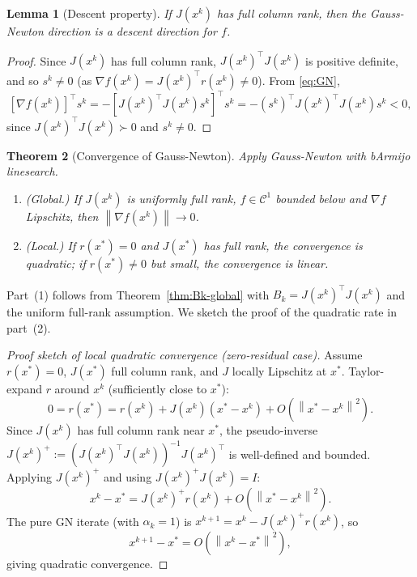 \documentclass[11pt,a4paper]{report}
\theoremstyle{plain}
\newtheorem{theorem}{Theorem}[chapter]
\newtheorem{lemma}[theorem]{Lemma}
\theoremstyle{definition}
\newcommand{\norm}[1]{\left\lVert#1\right\rVert}
\newcommand{\grad}{\nabla}
\newcommand{\trans}{^{\top}}
\begin{document}
\begin{lemma}[Descent property]\label{lem:GN-descent}
If $J(x^{k})$ has full column rank, then the Gauss-Newton direction is a descent
direction for $f$.
\end{lemma}
\begin{proof}
  Since $J(x^k)$ has full column rank, $J(x^k)\trans J(x^k)$ is positive definite, and so $s^{k}\ne 0$ (as $\grad f(x^{k})=J(x^{k})\trans r(x^{k})\ne 0$). From \eqref{eq:GN},
  \[
    [\grad f(x^k)]\trans s^k
    =-[J(x^{k})\trans J(x^{k})s^{k}]\trans s^{k}
    =-(s^{k})\trans J(x^{k})\trans J(x^{k})s^{k}<0,
  \]
  since $J(x^{k})\trans J(x^{k})\succ 0$ and $s^{k}\ne 0$.
\end{proof}

\begin{theorem}[Convergence of Gauss-Newton]\label{thm:GN-conv}
Apply Gauss-Newton with bArmijo linesearch.
\begin{enumerate}[leftmargin=2em,itemsep=0pt]
\item (Global.) If $J(x^{k})$ is uniformly full rank, $f\in\mathcal{C}^{1}$ bounded below
and $\grad f$ Lipschitz, then $\norm{\grad f(x^{k})}\to 0$.
\item (Local.) If $r(x^{*})=0$ and $J(x^{*})$ has full rank, the convergence is quadratic; if $r(x^{*})\ne 0$ but small, the convergence is linear.
\end{enumerate}
\end{theorem}

Part~(1) follows from Theorem~\ref{thm:Bk-global} with $B_{k}=J(x^{k})\trans J(x^{k})$ and the uniform full-rank assumption. We sketch the proof of the quadratic rate in part~(2).

\begin{proof}[Proof sketch of local quadratic convergence (zero-residual case)]
Assume $r(x^{*})=0$, $J(x^{*})$ full column rank, and $J$ locally Lipschitz at $x^{*}$.
Taylor-expand $r$ around $x^{k}$ (sufficiently close to $x^{*}$):
\[
0=r(x^{*})=r(x^{k})+J(x^{k})(x^{*}-x^{k})+O(\norm{x^{*}-x^{k}}^{2}).
\]
Since $J(x^{k})$ has full column rank near $x^{*}$, the pseudo-inverse
$J(x^{k})^{+}:=(J(x^{k})\trans J(x^{k}))^{-1}J(x^{k})\trans$ is well-defined and
bounded. Applying $J(x^{k})^{+}$ and using $J(x^{k})^{+}J(x^{k})=I$:
\[
x^{k}-x^{*}=J(x^{k})^{+}r(x^{k})+O(\norm{x^{*}-x^{k}}^{2}).
\]
The pure GN iterate (with $\alpha_{k}=1$) is
$x^{k+1}=x^{k}-J(x^{k})^{+}r(x^{k})$, so
\[
x^{k+1}-x^{*}=O(\norm{x^{k}-x^{*}}^{2}),
\]
giving quadratic convergence.
\end{proof}
\end{document}
